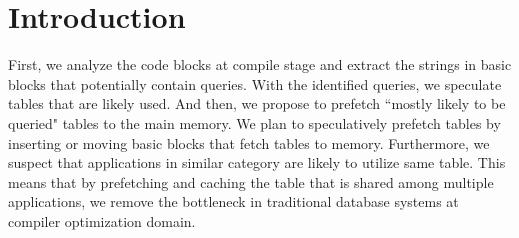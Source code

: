 \section{Introduction}
\label{sec:intro}
First, we analyze the code blocks at compile stage and extract the strings in
basic blocks that potentially contain queries. With the identified queries, we
speculate tables that are likely used. And then, we propose to prefetch ``mostly
likely to be queried" tables to the main memory. We plan to speculatively
prefetch tables by inserting or moving basic blocks that fetch tables to memory.
Furthermore, we suspect that applications in similar category are likely to
utilize same table. This means that by prefetching and caching the table that is
shared among multiple applications, we remove the bottleneck in traditional
database systems at compiler optimization domain. 
